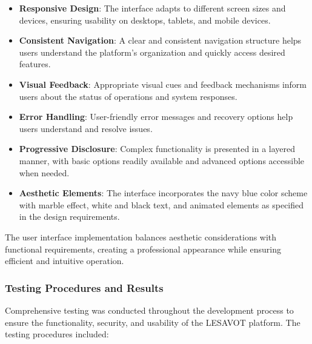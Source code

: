 \documentclass[12pt, a4paper, oneside]{book}
\begin{document}
\begin{itemize}[leftmargin=*]
    \item \textbf{Responsive Design}: The interface adapts to different screen sizes and devices, ensuring usability on desktops, tablets, and mobile devices.

    \item \textbf{Consistent Navigation}: A clear and consistent navigation structure helps users understand the platform's organization and quickly access desired features.

    \item \textbf{Visual Feedback}: Appropriate visual cues and feedback mechanisms inform users about the status of operations and system responses.

    \item \textbf{Error Handling}: User-friendly error messages and recovery options help users understand and resolve issues.

    \item \textbf{Progressive Disclosure}: Complex functionality is presented in a layered manner, with basic options readily available and advanced options accessible when needed.

    \item \textbf{Aesthetic Elements}: The interface incorporates the navy blue color scheme with marble effect, white and black text, and animated elements as specified in the design requirements.
\end{itemize}

The user interface implementation balances aesthetic considerations with functional requirements, creating a professional appearance while ensuring efficient and intuitive operation.

\subsubsection{Testing Procedures and Results}

Comprehensive testing was conducted throughout the development process to ensure the functionality, security, and usability of the LESAVOT platform. The testing procedures included:
\end{document}
